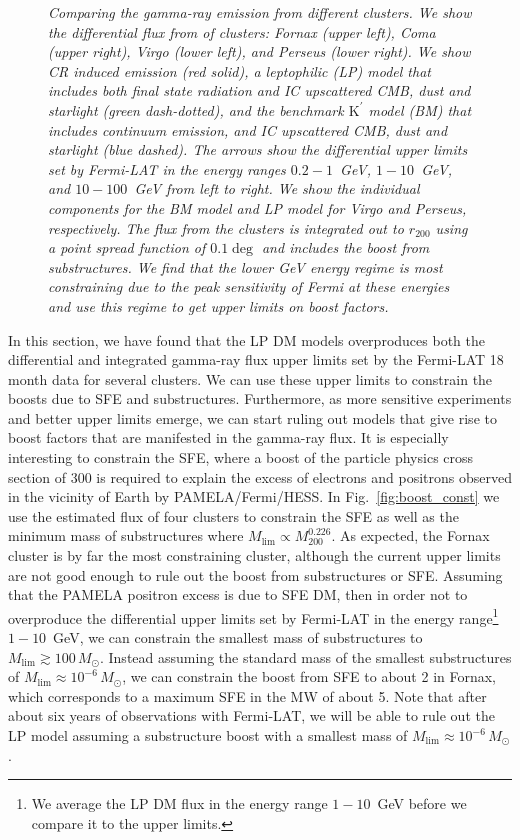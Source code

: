 \documentclass[10pt,aps,pra,reprint,amsmath,amsfonts,amssymb,showpacs,nofootinbib,floatfix]{revtex4-1}
\newcommand{\rmn}{\mathrm}
\newcommand{\msun}{M_\odot}
\newcommand{\Kp}{\rmn{K}^\prime}
\newcommand{\rvir}{r_{200}}
\newcommand{\mvir}{M_{200}}
\begin{document}
\begin{figure}
\begin{minipage}{2.0\columnwidth}
\caption{\it Comparing the gamma-ray emission from different
  clusters. We show the differential flux from of clusters: Fornax
  (upper left), Coma (upper right), Virgo (lower left), and Perseus
  (lower right). We show CR induced emission (red solid), a leptophilic
  (LP) model that includes both final state radiation and IC upscattered
  CMB, dust and starlight (green dash-dotted), and the benchmark $\Kp$
  model (BM) that includes continuum emission, and IC upscattered CMB, dust
  and starlight (blue dashed). The arrows show the differential upper
  limits set by Fermi-LAT in the energy ranges $0.2-1$~GeV,
  $1-10$~GeV, and $10-100$~GeV from left to right. We show the
  individual components for the BM model and LP model for Virgo and
  Perseus, respectively. The flux from the clusters is integrated out
  to $\rvir$ using a point spread function of $0.1\deg$ and includes
  the boost from substructures. We find that the lower GeV energy
  regime is most constraining due to the peak sensitivity of Fermi at
  these energies and use this regime to get upper limits on boost
  factors.}
 \label{fig:clu_comp}
\end{minipage}
\end{figure}


In this section, we have found that the LP DM models overproduces both
the differential and integrated gamma-ray flux upper limits set by the
Fermi-LAT 18 month data for several clusters. We can use these upper
limits to constrain the boosts due to SFE and
substructures. Furthermore, as more sensitive experiments and better
upper limits emerge, we can start ruling out models that give rise to
boost factors that are manifested in the gamma-ray flux. It is
especially interesting to constrain the SFE, where a boost of the
particle physics cross section of 300 is required to explain the
excess of electrons and positrons observed in the vicinity of Earth by
PAMELA/Fermi/HESS. In Fig.~\ref{fig:boost_const} we use the estimated
flux of four clusters to constrain the SFE as well as the minimum mass
of substructures where $M_\rmn{lim}\propto\mvir^{0.226}$. As expected,
the Fornax cluster is by far the most constraining cluster, although
the current upper limits are not good enough to rule out the boost
from substructures or SFE. Assuming that the PAMELA positron excess is
due to SFE DM, then in order not to overproduce the differential upper
limits set by Fermi-LAT in the energy range\footnote{We
  average the LP DM flux in the energy range $1-10$~GeV before we
  compare it to the upper limits.}  $1-10$~GeV, we can constrain the smallest mass
of substructures to $M_\rmn{lim}\gtrsim 100\,\msun$. Instead assuming
the standard mass of the smallest substructures of $M_\rmn{lim}\approx
10^{-6}\,\msun$, we can constrain the boost from SFE to about 2 in
Fornax, which corresponds to a maximum SFE in the MW of about 5. Note
that after about six years of observations with Fermi-LAT, we will be
able to rule out the LP model assuming a substructure boost with a
smallest mass of $M_\rmn{lim} \approx 10^{-6}\,\msun$.
\end{document}
